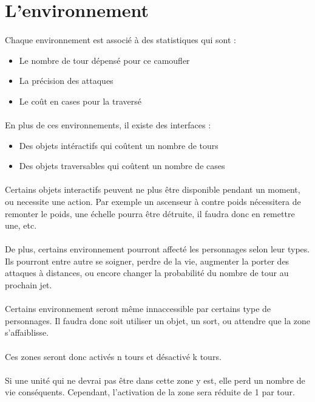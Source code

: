 \newpage
\section{L'environnement}
\paragraph{} Chaque environnement est associé à des statistiques qui sont :
\begin{itemize}
	\item Le nombre de tour dépensé pour ce camoufler
	\item La précision des attaques
	\item Le coût en cases pour la traversé
\end{itemize}

\paragraph{} En plus de ces environnements, il existe des interfaces :
\begin{itemize}
	\item Des objets intéractifs qui coûtent un nombre de tours
	\item Des objets traversables qui coûtent un nombre de cases
\end{itemize}

\paragraph{} Certains objets interactifs peuvent ne plus être disponible pendant un moment, ou necessite une action. Par exemple un ascenseur à contre poids nécessitera de remonter le poids, une échelle pourra être détruite, il faudra donc en remettre une, etc.

\paragraph{} De plus, certains environnement pourront affecté les personnages selon leur types. Ils pourront entre autre se soigner, perdre de la vie, augmenter la porter des attaques à distances, ou encore changer la probabilité du nombre de tour au prochain jet.

\paragraph{} Certains environnement seront même innaccessible par certains type de personnages. Il faudra donc soit utiliser un objet, un sort, ou attendre que la zone s'affaiblisse.

\paragraph{} Ces zones seront donc activés n tours et désactivé k tours.

\paragraph{} Si une unité qui ne devrai pas être dans cette zone y est, elle perd un nombre de vie conséquents. Cependant, l'activation de la zone sera réduite de 1 par tour.
